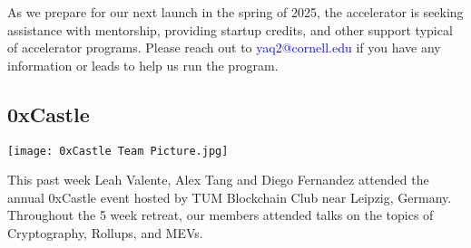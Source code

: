 \documentclass[10pt]{article}
\begin{document}
    \vspace{0.2cm}
    \noindent
    As we prepare for our next launch in the spring of 2025, the accelerator is seeking assistance with mentorship, providing startup credits, and other support typical of accelerator programs. Please reach out to \textcolor{blue}{yaq2@cornell.edu} if you have any information or leads to help us run the program.
    \vspace{0.2cm}
    \begin{parcolumns}{4}
    \end{parcolumns}
    \vspace{0.2cm}
    \begin{parcolumns}{4}
    \end{parcolumns} 
    \vspace{0.2cm}
        \begin{parcolumns}{4}
    \end{parcolumns}
    

\vspace{1cm}
\subsection*{0xCastle}
\begin{center}
    \texttt{[image: 0xCastle Team Picture.jpg]}
\end{center}
\noindent
This past week Leah Valente, Alex Tang and Diego Fernandez attended the annual 0xCastle event hosted by TUM Blockchain Club near Leipzig, Germany. Throughout the 5 week retreat, our members attended talks on the topics of Cryptography, Rollups, and MEVs.
\end{document}
